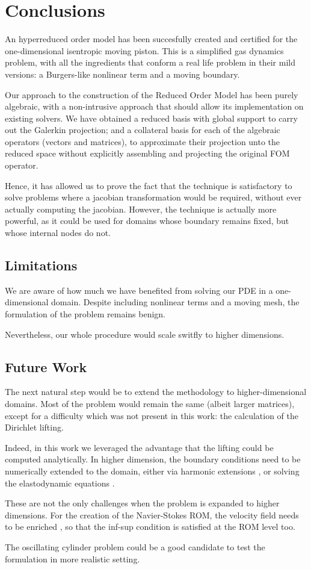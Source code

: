 \documentclass[thesis.tex]{subfiles}
\begin{document}
\section{Conclusions}
An hyperreduced order model has been succesfully created and certified for
the one-dimensional isentropic moving piston.
This is a simplified gas dynamics problem, 
with all the ingredients that conform a real life problem in their mild versions:
a Burgers-like nonlinear term and a moving boundary.

Our approach to the construction of the Reduced Order Model has been purely algebraic, 
with a non-intrusive approach that should allow its implementation on existing solvers.
We have obtained a reduced basis with global support to carry out the Galerkin projection;
and a collateral basis for each of the algebraic operators (vectors and matrices),
to approximate their projection unto the reduced space 
without explicitly assembling and projecting the original FOM operator.

Hence, it has allowed us to prove the fact that the technique is satisfactory
to solve problems where a jacobian transformation would be required,
without ever actually computing the jacobian. 
However, the technique is actually more powerful, 
as it could be used for domains whose boundary remains fixed,
but whose internal nodes do not.

\subsection{Limitations}
We are aware of how much we have benefited from solving our PDE in a one-dimensional domain.
Despite including nonlinear terms and a moving mesh,
the formulation of the problem remains benign. 

Nevertheless, our whole procedure would scale switfly to higher dimensions.

\subsection{Future Work}
The next natural step would be to extend the methodology to higher-dimensional domains.
Most of the problem would remain the same (albeit larger matrices), 
except for a difficulty which was not present in this work: 
the calculation of the Dirichlet lifting. 

Indeed, in this work we leveraged the advantage that the lifting could be computed analytically.
In higher dimension, the boundary conditions need to be numerically extended to the domain,
either via harmonic extensions
\cite{formaggiaALE},
or solving the elastodynamic equations
\cite{1995_farhat_elasticEquations}.

These are not the only challenges when the problem is expanded to higher dimensions.
For the creation of the Navier-Stokes ROM, the velocity field needs to be enriched
\cite{supremizers},
so that the inf-sup condition is satisfied at the ROM level too.

The oscillating cylinder problem could be a good candidate 
to test the formulation in more realistic setting.
\end{document}
